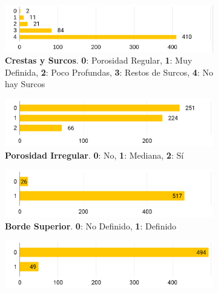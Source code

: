 \begin{figure}[H]
\begin{subfigure}{\textwidth}
    \centering
    \includegraphics[width=\linewidth]{imagenes/methods/1_crestasSurcos.png}
    \caption[Distribución de Crestas y Surcos en datos]{\textbf{Crestas y Surcos}. \textbf{0}: Porosidad Regular, \textbf{1}: Muy Definida, \textbf{2}: Poco Profundas, \textbf{3}: Restos de Surcos, \textbf{4}: No hay Surcos}
    \label{fig:todd1}
\end{subfigure}
\begin{subfigure}{\textwidth}
    \centering
    \includegraphics[width=\linewidth]{imagenes/methods/2_porosidadIrregular.png}
    \caption[Distribución de Porosidad Irregular en datos]{\textbf{Porosidad Irregular}. \textbf{0}: No, \textbf{1}: Mediana, \textbf{2}: Sí}
    \label{fig:todd2}
\end{subfigure}
\begin{subfigure}{\textwidth}
    \centering
    \includegraphics[width=\linewidth]{imagenes/methods/3_bordeSuperior.png}
    \caption[Distribución de Borde Superior en datos]{\textbf{Borde Superior}. \textbf{0}: No Definido, \textbf{1}: Definido}
    \label{fig:todd3}
\end{subfigure}
\begin{subfigure}{\textwidth}
    \centering
    \includegraphics[width=\linewidth]{imagenes/methods/4_noduloOseo.png}

\end{subfigure}
\end{figure}
